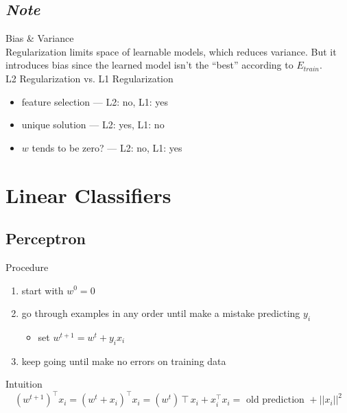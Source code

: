 \documentclass[10pt,landscape,a4paper]{article}
\begin{document}
\begin{multicols*}{5}
\subsection{\emph{Note}}
Bias \& Variance \\
Regularization limits space of learnable models, which
reduces variance. But it introduces bias since the learned model isn't the ``best'' according to \(E_{train}\). \\
L2 Regularization vs. L1 Regularization \\
\begin{itemize}
    \item feature selection --- L2: no, L1: yes
    \item unique solution --- L2: yes, L1: no
    \item \(w\) tends to be zero? --- L2: no, L1: yes
\end{itemize}

\section{Linear Classifiers}

\subsection{Perceptron}
Procedure
\begin{enumerate}
    \item start with \(w^0 = 0\)
    \item go through examples in any order until make a mistake predicting \(y_i\)
    \begin{itemize}
        \item set \(w^{t+1} = w^t + y_i x_i\)
    \end{itemize}
    \item keep going until make no errors on training data
\end{enumerate}
Intuition
\begin{dmath*}
    (w^{t+1})^\intercal x_i = (w^t + x_i)^\intercal x_i = (w^t)\intercal x_i + x_i^\intercal x_i = \text{ old prediction } + ||x_i||^2
\end{dmath*}


\end{multicols*}
\end{document}
